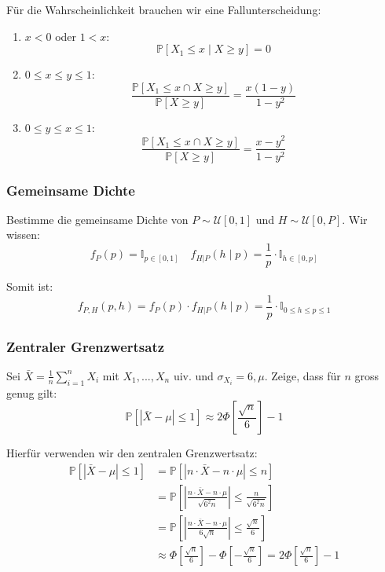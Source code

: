 \documentclass[a4paper,10pt]{article}
\def\P{\mathbb{P}}
\begin{document}
Für die Wahrscheinlichkeit brauchen wir eine Fallunterscheidung: \smallskip

\begin{enumerate}
	\item \(x < 0\) oder \(1 < x\):
	      \[\mathbb{P}[X_1 \leq x \mid X \geq y] = 0\]
	\item \(0 \leq x \leq y \leq 1\):
	      \[\frac{\mathbb{P}[X_1 \leq x \cap X \geq y]}{\mathbb{P}[X \geq y]} = \frac{x(1-y)}{1 - y^2}\]
	\item \(0 \leq y \leq x \leq 1\):
	      \[\frac{\mathbb{P}[X_1 \leq x \cap X \geq y]}{\mathbb{P}[X \geq y]} = \frac{x - y^2}{1 - y^2}\]
\end{enumerate}

\subsubsection*{Gemeinsame Dichte}

Bestimme die gemeinsame Dichte von \(P \sim \mathcal{U}[0,1]\) und \(H \sim \mathcal{U}[0,P]\). Wir wissen:
\[f_P(p) = \mathbb I_{p \in [0,1]} \quad f_{H | P}(h \mid p) = \frac{1}{p} \cdot \mathbb{I}_{h \in [0,p]}\]

\noindent
Somit ist:
\[f_{P, H} (p, h) = f_P(p) \cdot f_{H | P}(h \mid p) = \frac{1}{p} \cdot \mathbb I_{0 \leq h \leq p \leq 1}\]

\subsubsection*{Zentraler Grenzwertsatz}
Sei \(\bar X = \frac{1}{n} \sum_{i=1}^n X_i\) mit \(X_1,...,X_n\) uiv. und \(\sigma_{X_i} = 6, \mu\). Zeige, dass für \(n\) gross genug gilt:
\[\P[|\bar X - \mu| \leq 1] \approx 2 \Phi \left[\frac{\sqrt{n}}{6} \right] - 1\]

\noindent
Hierfür verwenden wir den zentralen Grenzwertsatz:
\begin{align*}
	\P[|\bar X - \mu| \leq 1] & = \P[|n \cdot \bar X - n \cdot \mu| \leq n]                                                                                          \\
	                          & = \P \left[\left|\frac{n \cdot \bar X - n \cdot \mu}{\sqrt{6^2 n}}\right| \leq \frac{n}{\sqrt{6^2 n}}\right]                         \\
	                          & = \P \left[\left|\frac{n \cdot \bar X - n \cdot \mu}{6 \sqrt n}\right| \leq \frac{\sqrt n}{6}\right]                                 \\
	                          & \approx \Phi \left[ \frac{\sqrt n}{6} \right] - \Phi \left[ -\frac{\sqrt n}{6} \right] = 2 \Phi \left[ \frac{\sqrt n}{6} \right] - 1
\end{align*}
\end{document}
